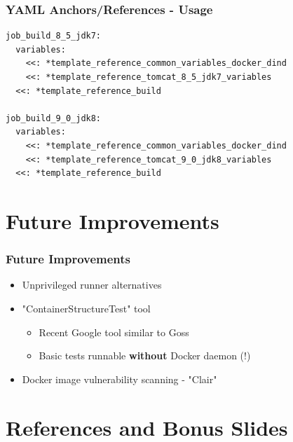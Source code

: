 \documentclass[14pt,aspectratio=169]{beamer}
\begin{document}
\begin{frame}
  \frametitle{YAML Anchors/References - Usage}

  \begin{verbatim}
job_build_8_5_jdk7:
  variables:
    <<: *template_reference_common_variables_docker_dind
    <<: *template_reference_tomcat_8_5_jdk7_variables
  <<: *template_reference_build

job_build_9_0_jdk8:
  variables:
    <<: *template_reference_common_variables_docker_dind
    <<: *template_reference_tomcat_9_0_jdk8_variables
  <<: *template_reference_build
  \end{verbatim}
\end{frame}

\subsection{}

\section{Future Improvements}

\begin{frame}
  \frametitle{Future Improvements}
  \begin{itemize}
    \item Unprivileged runner alternatives
    \item "ContainerStructureTest" tool
    \begin{itemize}
      \item Recent Google tool similar to Goss
      \item Basic tests runnable \textbf{without} Docker daemon (!)
    \end{itemize}
    \item Docker image vulnerability scanning - "Clair"
  \end{itemize}
\end{frame}

\section{}

\cernSplashWhite

\section{References and Bonus Slides}
\end{document}
